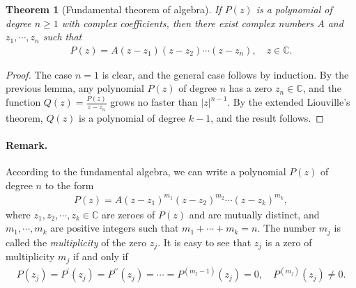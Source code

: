 \documentclass{article}
\numberwithin{equation}{section}
\newcommand{\bbC}{\mathbb{C}}
\theoremstyle{plain}
\newtheorem{theorem}{Theorem}[section]
\theoremstyle{definition}
\begin{document}
\begin{theorem}[Fundamental theorem of algebra]\label{fundalge}
If $P(z)$ is a polynomial of degree $n\geq 1$ with complex coefficients, then there exist complex numbers $A$ and $z_1,\cdots,z_n$ such that
\begin{align*}
	P(z)=A(z-z_1)(z-z_2)\cdots(z-z_n),\quad z\in\bbC.
\end{align*}
\end{theorem}
\begin{proof}
The case $n=1$ is clear, and the general case follows by induction. By the previous lemma, any polynomial $P(z)$ of degree $n$ has a zero $z_n\in\bbC$, and the function $Q(z)=\frac{P(z)}{z-z_n}$ grows no faster than $\vert z\vert^{n-1}$. By the extended Liouville's theorem, $Q(z)$ is a polynomial of degree $k-1$, and the result follows.
\end{proof}

\paragraph{Remark.} According to the fundamental algebra, we can write a polynomial $P(z)$ of degree $n$ to the form
\begin{align*}
	P(z)=A(z-z_1)^{m_1}(z-z_2)^{m_2}\cdots(z-z_k)^{m_k},
\end{align*}
where $z_1,z_2,\cdots,z_k\in\bbC$ are zeroes of $P(z)$ and are mutually distinct, and $m_1,\cdots,m_k$ are positive integers such that $m_1+\cdots+m_k=n$. The number $m_j$ is called the \textit{multiplicity} of the zero $z_j$. It is easy to see that $z_j$ is a zero of multiplicity $m_j$ if and only if
\begin{align}
	P(z_j)=P^\prime(z_j)=P^{\prime\prime}(z_j)=\cdots=P^{(m_j-1)}(z_j)=0,\quad P^{(m_j)}(z_j)\neq 0.\label{charmulti}
\end{align}
\end{document}
